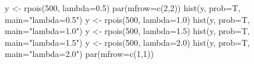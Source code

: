 \begin{Schunk}
\begin{Sinput}
 y <- rpois(500, lambda=0.5)
 par(mfrow=c(2,2))
 hist(y, prob=T, main="lambda=0.5")
 y <- rpois(500, lambda=1.0)
 hist(y, prob=T, main="lambda=1.0")
 y <- rpois(500, lambda=1.5)
 hist(y, prob=T, main="lambda=1.5")
 y <- rpois(500, lambda=2.0)
 hist(y, prob=T, main="lambda=2.0")
 par(mfrow=c(1,1))
\end{Sinput}
\end{Schunk}
